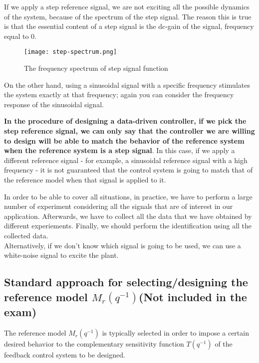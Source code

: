 \begin{factbox}
If we apply a step reference signal, we are not exciting all the possible dynamics of the system, because of the spectrum of the step signal. The reason this is true is that the essential content of a step signal is the dc-gain of the signal, frequency equal to 0.\\
 \begin{figure}[H]
    \centering
    \texttt{[image: step-spectrum.png]}
    \caption{The frequency spectrum of step signal function}
 \end{figure}
 
 On the other hand, using a sinusoidal signal with a specific frequency stimulates the system exactly at that frequency; again you can consider the frequency response of the sinusoidal signal.\\
 
 \end{factbox}
 \begin{factbox}
 \textbf{In the procedure of designing a data-driven controller, if we pick the step reference signal, we can only say that the controller we are willing to design will be able to match the behavior of the reference system when the reference system is a step signal}. In this case, if we apply a different reference signal - for example, a sinusoidal reference signal with a high frequency - it is not guaranteed that the control system is going to match that of the reference model when that signal is applied to it.
 
In order to be able to cover all situations, in practice, we have to perform a large number of experiment considering all the signals that are of interest in our application. Afterwards, we have to collect all the data that we have obtained by different experiements. Finally, we should perform the identification using all the collected data.\\

Alternatively, if we don't know which signal is going to be used, we can use a white-noise signal to excite the plant. 

\end{factbox}


\subsection{Standard approach for selecting/designing the reference model $M_r(q^{-1})$(Not included in the exam)}
The reference model $M_r(q^{-1})$ is typically selected in order to impose a certain desired behavior to the complementary sensitivity function $T(q^{-1})$ of the feedback control system to be designed.

